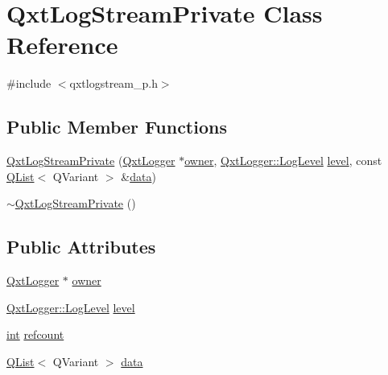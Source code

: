 \hypertarget{class_qxt_log_stream_private}{\section{Qxt\-Log\-Stream\-Private Class Reference}
\label{class_qxt_log_stream_private}
}


{\ttfamily \#include $<$qxtlogstream\-\_\-p.\-h$>$}

\subsection*{Public Member Functions}
\begin{DoxyCompactItemize}
\item 
\hyperlink{class_qxt_log_stream_private_a0ac0a2e07b01082bcd5197e93121c621}{Qxt\-Log\-Stream\-Private} (\hyperlink{class_qxt_logger}{Qxt\-Logger} $\ast$\hyperlink{class_qxt_log_stream_private_a1c1956693c23cf09f1ffffaad135983c}{owner}, \hyperlink{class_qxt_logger_ac2071072628aa786466124cc32a324e7}{Qxt\-Logger\-::\-Log\-Level} \hyperlink{glext_8h_abc60a79088789bd61297bf5f9ff500d1}{level}, const \hyperlink{class_q_list}{Q\-List}$<$ Q\-Variant $>$ \&\hyperlink{glext_8h_a8850df0785e6fbcc2351af3b686b8c7a}{data})
\item 
\hyperlink{class_qxt_log_stream_private_aaf4fda1d5a7fc16289517f0f39b1edb5}{$\sim$\-Qxt\-Log\-Stream\-Private} ()
\end{DoxyCompactItemize}
\subsection*{Public Attributes}
\begin{DoxyCompactItemize}
\item 
\hyperlink{class_qxt_logger}{Qxt\-Logger} $\ast$ \hyperlink{class_qxt_log_stream_private_a1c1956693c23cf09f1ffffaad135983c}{owner}
\item 
\hyperlink{class_qxt_logger_ac2071072628aa786466124cc32a324e7}{Qxt\-Logger\-::\-Log\-Level} \hyperlink{class_qxt_log_stream_private_aab2276f656699d017ddfc35532282b1c}{level}
\item 
\hyperlink{ioapi_8h_a787fa3cf048117ba7123753c1e74fcd6}{int} \hyperlink{class_qxt_log_stream_private_ac3a3dc010ce0185d73b6f168776e6996}{refcount}
\item 
\hyperlink{class_q_list}{Q\-List}$<$ Q\-Variant $>$ \hyperlink{class_qxt_log_stream_private_adbb8dcaa228f8faf903fcdc7f7fac98b}{data}
\end{DoxyCompactItemize}
